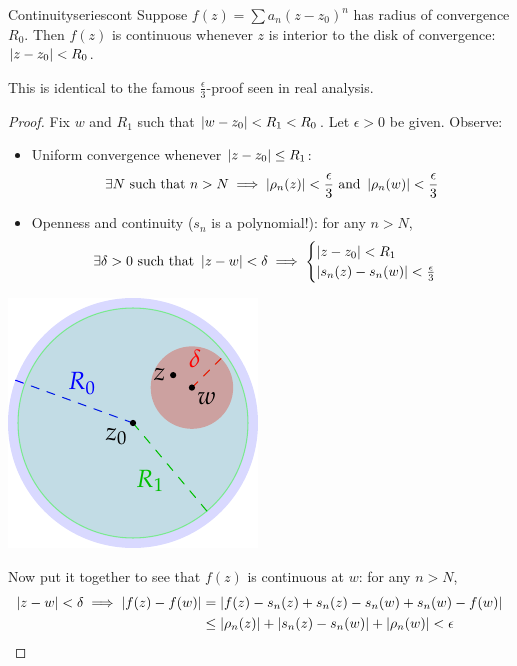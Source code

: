 \begin{thm}{Continuity}{seriescont}
Suppose $f(z)=\sum a_n(z-z_0)^n$ has radius of convergence $R_0$. Then $f(z)$ is continuous whenever $z$ is interior to the disk of convergence: $\left| z-z_0\right|<R_0$.
\end{thm}

This is identical to the famous $\frac\epsilon 3$-proof seen in real analysis.
\begin{proof}
Fix $w$ and $R_1$ such that $\left| w-z_0\right|<R_1<R_0$. Let $\epsilon>0$ be given. Observe:\par
\begin{minipage}[t]{0.7\linewidth}\vspace{0pt}
\begin{itemize}
	\item Uniform convergence whenever $\left| z-z_0\right|\le R_1$:
	\[\exists N\text{ such that }n>N\implies \left| \rho_n(z)\right|<\frac\epsilon 3\text{ and }\left| \rho_n(w)\right|<\frac\epsilon 3\]
  \item Openness and continuity ($s_n$ is a polynomial!): for any $n>N$,
  \[\exists\delta>0\text{ such that } \left| z-w\right|<\delta\implies
  \begin{cases}
  \left| z-z_0\right|<R_1\\
	\left| s_n(z)-s_n(w)\right|<\frac\epsilon 3
  \end{cases}\]
\end{itemize}
\end{minipage}\begin{minipage}[t]{0.3\linewidth}\vspace{-10pt}
\flushright\includegraphics{cont}
\end{minipage}\smallbreak
Now put it together to see that $f(z)$ is continuous at $w$: for any $n>N$,
\begin{align*}
\left| z-w\right|<\delta\implies \left| f(z)-f(w)\right|&=\left| f(z)-s_n(z)+s_n(z)-s_n(w)+s_n(w)-f(w)\right|\\
&\le \left| \rho_n(z)\right|+\left| s_n(z)-s_n(w)\right|+\left| \rho_n(w)\right|<\epsilon\tag*{\qedhere}
\end{align*}
\end{proof}

